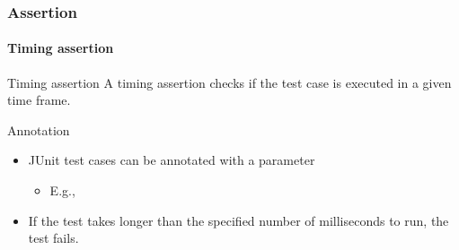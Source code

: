 \begin{frame}[parent={concept:assertion}, hasprev=false, hasnext=false]
\frametitle{Assertion}
\framesubtitle{Timing assertion}
\label{concept:junit-timing-assertion}
\label{concept:timing-assertion}

\begin{block:concept}{Timing assertion}
A timing assertion checks if the test case is executed in a given time frame.
\end{block:concept}


\begin{block:fact}{Annotation}
\begin{itemize}
	\item JUnit test cases can be annotated with a  parameter
	\begin{itemize}
		\item E.g., 
	\end{itemize}

	\item If the test takes longer than the specified number of milliseconds to
	run, the test fails.
\end{itemize}
\end{block:fact}

\hfill
{}
\end{frame}